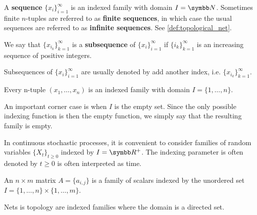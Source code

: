 \begin{definition}\label{def:sequence}
  A \textbf{sequence} \( \{ x_i \}_{i=1}^\infty \) is an indexed family with domain \( I = \BB N \). Sometimes finite \( n \)-tuples are referred to as \textbf{finite sequences}, in which case the usual sequences are referred to as \textbf{infinite sequences}. See \cref{def:topological_net}.

  We say that \( \{ x_{i_k} \}_{k=1}^\infty \) is a \textbf{subsequence} of \( \{ x_i \}_{i=1}^\infty \) if \( \{ i_k \}_{k=1}^\infty \) is an increasing sequence of positive integers.

  Subsequences of \( \{ x_i \}_{i=1}^\infty \) are usually denoted by add another index, i.e. \( \{ x_{i_k} \}_{k=1}^\infty \).
\end{definition}

\begin{example}\label{ex:indexed_families}
  \mbox{}
  \begin{defenum}
    \item Every n-tuple \( (x_1, \ldots, x_n) \) is an indexed family with domain \( I = \{ 1, \ldots, n \} \).

    \item An important corner case is when \( I \) is the empty set. Since the only possible indexing function is then the empty function, we simply say that the resulting family is empty.

    \item In continuous stochastic processes, it is convenient to consider families of random variables \( \{ X_t \}_{t \geq 0} \) indexed by \( I = \BB R^+ \). The indexing parameter is often denoted by \( t \geq 0 \) is often interpreted as time.

    \item An \( n \times m \) matrix \( A = \{ a_{i,j} \} \) is a family of scalars indexed by the unordered set \( I = \{ 1, \ldots, n \} \times \{ 1, \ldots, m \} \).

    \item Nets is topology are indexed families where the domain is a directed set.
  \end{defenum}
\end{example}
